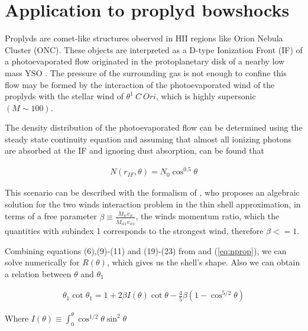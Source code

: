 \section{Application to proplyd bowshocks}
\label{sec:application}

Proplyds are comet-like structures observed in HII regions like Orion Nebula Cluster (ONC). 
These objects are interpreted as a D-type Ionization Front (IF) of a photoevaporated flow 
originated in the protoplanetary disk of a nearby low mass YSO \citep{Johnstone:1998}.
The pressure of the surrounding gas is not enough to confine this flow \citep{HA:1998}
may be formed by the interaction of the photoevaporated wind of the proplyds with the stellar wind of $\theta^1~C~Ori$, which is highly supersonic $(M \sim 100)$. 

The density distribution of the photoevaporated flow can be determined using the steady state continuity equation and assuming that almost all ionizing photons are absorbed at the IF \citep{HA:1998} and ignoring dust absorption, can be found that

\begin{align}
N(r_{IF},\theta) = N_0 \cos^{0.5}\theta
\label{eq:nprop}
\end{align}

This scenario can be described with the formalism of \citep{Canto:1996}, who proposes an algebraic solution for the two winds interaction problem in the thin shell approximation, in terms of a free parameter $\beta\equiv\frac{\dot{M}_wv_w}{\dot{M}_{w1}v_{w1}}$,
the winds momentum ratio, which the quantities with subindex 1 corresponds to the strongest wind, therefore $\beta<=1$. 


 Combining equations (6),(9)-(11) and (19)-(23) from \citep{Canto:1996} and (\ref{eq:nprop}), we can solve numerically for $R(\theta)$, which gives us the shell's shape. Also we can
obtain a relation between $\theta$ and $\theta_1$

\begin{align}
\theta_1\cot\theta_1 = 1+ 2\beta I(\theta)\cot\theta - \frac{4}{5}\beta\left(1-\cos^{5/2}\theta\right)
\label{eq:th1th}
\end{align}

Where $I(\theta)\equiv \int^\theta_0 \cos^{1/2}\theta\sin^2\theta$

